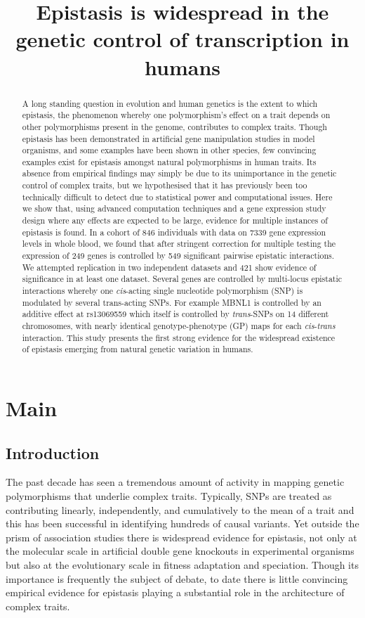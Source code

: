 \documentclass{article}
\title{Epistasis is widespread in the genetic control of transcription in humans}
\begin{document}
\maketitle


\begin{abstract}
A long standing question in evolution and human genetics is the extent to which epistasis, the phenomenon whereby one polymorphism's effect on a trait depends on other polymorphisms present in the genome, contributes to complex traits. Though epistasis has been demonstrated in artificial gene manipulation studies in model organisms, and some examples have been shown in other species, few convincing examples exist for epistasis amongst natural polymorphisms in human traits. Its absence from empirical findings may simply be due to its unimportance in the genetic control of complex traits, but we hypothesised that it has previously been too technically difficult to detect due to statistical power and computational issues. Here we show that, using advanced computation techniques and a gene expression study design where any effects are expected to be large, evidence for multiple instances of epistasis is found. In a cohort of 846 individuals with data on 7339 gene expression levels in whole blood, we found that after stringent correction for multiple testing the expression of 249 genes is controlled by 549 significant pairwise epistatic interactions. We attempted replication in two independent datasets and 421 show evidence of significance in at least one dataset. Several genes are controlled by multi-locus epistatic interactions whereby one \emph{cis}-acting single nucleotide polymorphism (SNP) is modulated by several trans-acting SNPs. For example MBNL1 is controlled by an additive effect at rs13069559 which itself is controlled by \emph{trans}-SNPs on 14 different chromosomes, with nearly identical genotype-phenotype (GP) maps for each \emph{cis}-\emph{trans} interaction. This study presents the first strong evidence for the widespread existence of epistasis emerging from natural genetic variation in humans.
\end{abstract}


\section{Main}

\subsection{Introduction}
The past decade has seen a tremendous amount of activity in mapping genetic polymorphisms that underlie complex traits. Typically, SNPs are treated as contributing linearly, independently, and cumulatively to the mean of a trait and this has been successful in identifying hundreds of causal variants. Yet outside the prism of association studies there is widespread evidence for epistasis, not only at the molecular scale in artificial double gene knockouts in experimental organisms but also at the evolutionary scale in fitness adaptation and speciation. Though its importance is frequently the subject of debate, to date there is little convincing empirical evidence for epistasis playing a substantial role in the architecture of complex traits.
\end{document}
